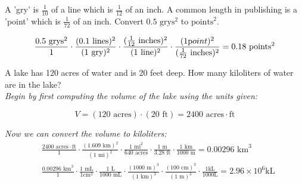 \documentclass{package/notes}
\begin{document}
\begin{problem}
	A 'gry' is $\frac{1}{10}$ of a line which is $\frac{1}{12}$ of an inch. A common length in publishing is a 'point' which is $\frac{1}{72}$ of an inch. Convert $0.5\text{ grys}^2$ to $\text{points}^2$.

	$$
	\frac{0.5\text{ grys}^2}{1}\cdot\frac{(0.1\text{ lines})^2}{(1
	\text{ gry})^2}\cdot\frac{(\frac{1}{12}\text{ inches})^2}{(1\text{ line})^2}\cdot\frac{(1\text point)^2}{(\frac{1}{72}\text{ inches})^2} = 0.18\text{ points}^2
	$$
\end{problem}

\begin{problem}
	A lake has 120 acres of water and is 20 feet deep. How many kiloliters of water are in the lake?\\

	\textit{Begin by first computing the volume of the lake using the units given:}

	$$
	V = (120\text{ acres}) \cdot (20\text{ ft}) = 2400 \text{ acres}\cdot\text{ft}
	$$

	\textit{Now we can convert the volume to kiloliters:}
	$$
	\begin{aligned}
		&\frac{2400\text{ acres}\cdot\text{ft}}{1}\cdot\frac{(1.609\text{ km})^2}{(1\text{ mi})^2}\cdot\frac{1\text{ mi}^2}{640\text{ acres}}\cdot\frac{1\text{ m}}{3.28\text{ ft}}\cdot\frac{1\text{ km}}{1000\text{ m}} = 0.00296\text{ km}^3\\
		&\frac{0.00296\text{ km}^3}{1}\cdot\frac{1\text{ mL}}{1 \text{cm}^3}\cdot\frac{1\text{ L}}{1000\text{ mL}}\cdot\frac{(1000\text{ m})^3}{(1\text{ km})^3}\cdot\frac{(100\text{ cm})^3}{(1\text{ m})^3}\cdot\frac{1\text{kL}}{1000\text{L}} = 2.96 \times 10^6 \text{kL}
	\end{aligned}
	$$
\end{problem}
\end{document}

